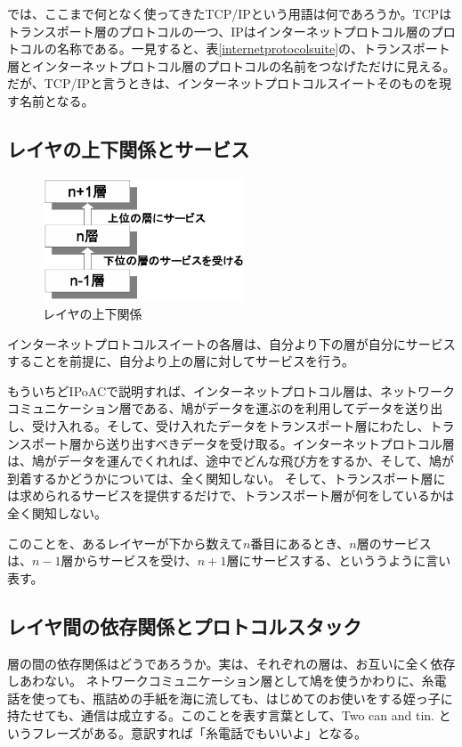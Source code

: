 では、ここまで何となく使ってきたTCP/IPという用語は何であろうか。TCPはトランスポート層のプロトコルの一つ、IPはインターネットプロトコル層のプロトコルの名称である。一見すると、表\ref{internetprotocolsuite}の、トランスポート層とインターネットプロトコル層のプロトコルの名前をつなげただけに見える。
だが、TCP/IPと言うときは、インターネットプロトコルスイートそのものを現す名前となる。

\subsection{レイヤの上下関係とサービス}

\begin{figure}
	\includegraphics[width=6cm, clip]{draw/service.eps}
	\caption{レイヤの上下関係}
	\label{fig:service}
\end{figure}

インターネットプロトコルスイートの各層は、自分より下の層が自分にサービスすることを前提に、自分より上の層に対してサービスを行う。

もういちどIPoACで説明すれば、インターネットプロトコル層は、ネットワークコミュニケーション層である、鳩がデータを運ぶのを利用してデータを送り出し、受け入れる。そして、受け入れたデータをトランスポート層にわたし、トランスポート層から送り出すべきデータを受け取る。インターネットプロトコル層は、鳩がデータを運んでくれれば、途中でどんな飛び方をするか、そして、鳩が到着するかどうかについては、全く関知しない。
そして、トランスポート層には求められるサービスを提供するだけで、トランスポート層が何をしているかは全く関知しない。

このことを、あるレイヤーが下から数えて$n$番目にあるとき、$n$層のサービスは、$n-1$層からサービスを受け、$n+1$層にサービスする、といううように言い表す。

\subsection{レイヤ間の依存関係とプロトコルスタック}

層の間の依存関係はどうであろうか。実は、それぞれの層は、お互いに全く依存しあわない。
ネトワークコミュニケーション層として鳩を使うかわりに、糸電話を使っても、瓶詰めの手紙を海に流しても、はじめてのお使いをする姪っ子に持たせても、通信は成立する。このことを表す言葉として、Two can and tin. というフレーズがある。意訳すれば「糸電話でもいいよ」となる。

